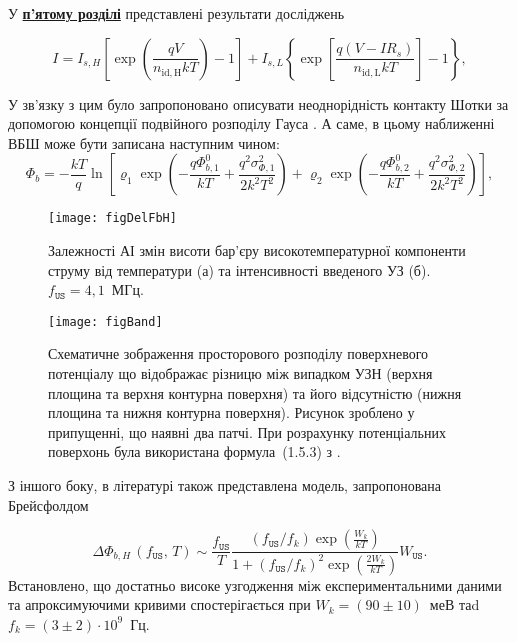 \documentclass[a5paper,10pt,twoside,openany,article]{memoir} %
\begin{document}
У  \underline{\textbf{п'ятому розділі}} представлені результати досліджень

\begin{equation}
\label{eqSDB_IV}
  I=I_{s,H}\left[\exp\left(\frac{qV}{n_\mathrm{id,H}kT}\right)-1\right]+
 I_{s,L}\left\{\exp\left[\frac{q(V-IR_s)}{n_\mathrm{id,L}kT}\right]-1\right\},
\end{equation}


У зв'язку з цим було запропоновано описувати неоднорідність контакту Шотки за допомогою концепції подвійного розподілу Гауса \cite{Jiang:DG}.
А саме, в цьому наближенні ВБШ може бути записана наступним чином:
\begin{equation}
\label{eqDG}
  \Phi_b=-\frac{kT}{q}\ln\left[\varrho_1\exp\left(-\frac{q\Phi_{b,1}^0}{kT}+
  \frac{q^2\sigma^2_{\Phi,1}}{2k^2T^2}\right)
   +
  \varrho_2\exp\left(-\frac{q\Phi_{b,2}^{0}}{kT}+
  \frac{q^2\sigma^2_{\Phi,2}}{2k^2T^2}\right)\right],
\end{equation}

\begin{figure}
\center
\texttt{[image: figDelFbH]}
\caption{\label{figDelFbH}
Залежності АІ змін висоти бар'єру високотемпературної компоненти струму від температури (а) та інтенсивності введеного УЗ (б).
$f_\mathtt{US}=4,1$~МГц.
}%
\end{figure}


\begin{figure}
\center
\texttt{[image: figBand]}
\caption{\label{figBand}
Схематичне зображення
просторового розподілу поверхневого потенціалу
що відображає різницю між випадком УЗН (верхня площина та верхня контурна поверхня) та
його відсутністю (нижня площина та нижня контурна поверхня).
Рисунок зроблено у припущенні, що наявні два патчі.
При розрахунку потенціальних поверхонь була використана формула~(1.5.3) з \cite{Tung:MSE}.
}%
\end{figure}


З іншого боку, в літературі \cite{Brailsford} також представлена модель, запропонована Брейсфолдом

\begin{equation}
\label{eqBr}
\Delta\Phi_{b,H}\,(f_\mathtt{US},\,T)\sim\frac{f_\mathtt{US}}{T}\frac{(f_\mathtt{US}/{f_k})\exp\left(\frac{W_k}{kT}\right)}
{1+(f_\mathtt{US}/{f_k})^2\exp\left(\frac{2W_k}{kT}\right)}W_\mathtt{US}.
\end{equation}
Встановлено, що достатньо високе узгодження між експериментальними даними та апроксимуючими кривими спостерігається
при  $W_k=(90\pm10)$~меВ таd $f_k=(3\pm2)\cdot10^9$~Гц.
\end{document}
